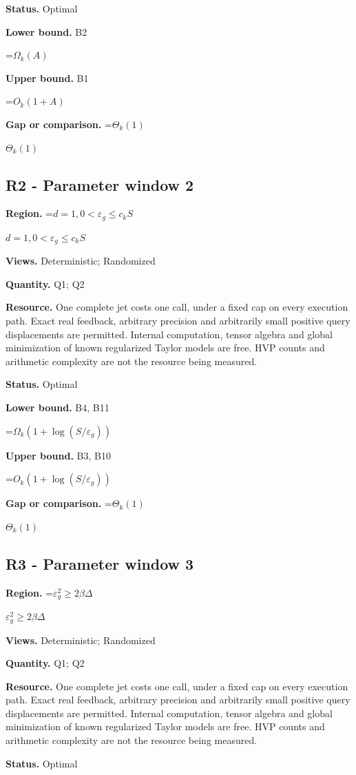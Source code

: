 \documentclass[10pt,a4paper]{article}
\newcommand{\AtlasMath}[1]{\par\begingroup\centering\setbox0=\hbox{$\displaystyle #1$}\ifdim\wd0>1.4\linewidth\typeout{ATLAS WIDE FORMULA: \the\wd0}\fi\ifdim\wd0>\linewidth\resizebox{\linewidth}{!}{\box0}\else\box0\fi\par\endgroup}
\newcommand{\AtlasInlineMath}[1]{\begingroup\setbox0=\hbox{$#1$}\ifdim\wd0>.4\linewidth\endgroup\AtlasMath{#1}\else\endgroup$#1$\fi}
\begin{document}
\textbf{Status.} Optimal

\textbf{Lower bound.} B2

\AtlasMath{\Omega_k(A)}
\textbf{Upper bound.} B1

\AtlasMath{O_k(1+A)}
\textbf{Gap or comparison.} \AtlasInlineMath{\Theta_k(1)}

\subsection{R2 - Parameter window 2}
\textbf{Region.} \AtlasInlineMath{d=1,0<\varepsilon_g\le c_k S}

\textbf{Views.} Deterministic; Randomized

\textbf{Quantity.} Q1; Q2

\textbf{Resource.} One complete jet costs one call, under a fixed cap on every execution path. Exact real feedback, arbitrary precision and arbitrarily small positive query displacements are permitted. Internal computation, tensor algebra and global minimization of known regularized Taylor models are free. HVP counts and arithmetic complexity are not the resource being measured.

\textbf{Status.} Optimal

\textbf{Lower bound.} B4, B11

\AtlasMath{\Omega_k(1+\log(S/\varepsilon_g))}
\textbf{Upper bound.} B3, B10

\AtlasMath{O_k(1+\log(S/\varepsilon_g))}
\textbf{Gap or comparison.} \AtlasInlineMath{\Theta_k(1)}

\subsection{R3 - Parameter window 3}
\textbf{Region.} \AtlasInlineMath{\varepsilon_g^2\ge 2\beta\Delta}

\textbf{Views.} Deterministic; Randomized

\textbf{Quantity.} Q1; Q2

\textbf{Resource.} One complete jet costs one call, under a fixed cap on every execution path. Exact real feedback, arbitrary precision and arbitrarily small positive query displacements are permitted. Internal computation, tensor algebra and global minimization of known regularized Taylor models are free. HVP counts and arithmetic complexity are not the resource being measured.

\textbf{Status.} Optimal
\end{document}

